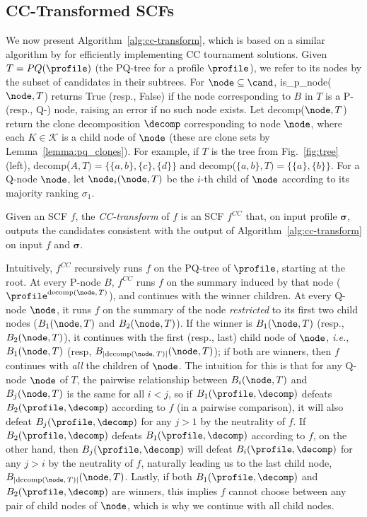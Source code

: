 \subsection{CC-Transformed SCFs}\label{subsec:transform}
We now present Algorithm~\ref{alg:cc-transform}, which is based on a similar algorithm by \citet{Brandt11:Fixed} for efficiently implementing CC tournament solutions. Given $T=PQ(\profile)$ (the PQ-tree for a profile $\profile$), we refer to its nodes by the subset of candidates in their subtrees. For $\node \subseteq \cand$, is\_p\_node($\node,T$) returns True (resp., False) if the node corresponding to $B$ in $T$ is a P- (resp., Q-) node, raising an error if no such node exists. Let decomp($\node,T$) return the clone decomposition $\decomp$ corresponding to node $\node$, where each $K\in \mathcal{K}$ is a child node of $\node$ (these are clone sets by Lemma~\ref{lemma:pq_clones}).
For example, if $T$ is the tree from Fig.~\ref{fig:tree}(left),
decomp($A,T)=\{\{a,b\}, \{c\}, \{d\}\}$ and  decomp($\{a,b\},T)=\{\{a\}, \{b\}\}$.  For a Q-node $\node$, let $\node_i(\node,T)$ be the $i$-th child of $\node$ according to its majority ranking $\sigma_1$. 

\begin{definition}\label{def:cc-transform}
    Given an SCF $f$, the \emph{CC-transform} of $f$ is an SCF $f^{CC}$ that, on input profile $\boldsymbol{\sigma}$, outputs the candidates consistent with the output of Algorithm~\ref{alg:cc-transform} on input $f$ and $\boldsymbol{\sigma}$. 
\end{definition}

Intuitively, $f^{CC}$ recursively runs $f$ on the PQ-tree of $\profile$, starting at the root. At every P-node $B$, $f^{CC}$ runs $f$ on the summary induced by that node ($\profile^{\text{decomp($\node,T$)}}$), and continues with the winner children. At every Q-node $\node$, it runs $f$ on the summary of the node \emph{restricted} to its first two child nodes ($B_1(\node,T)$ and $B_2(\node,T)$). If the winner is $B_1(\node,T)$ (resp., $B_2(\node,T)$), it continues with the first (resp., last) child node of $\node$, \emph{i.e.}, $B_1(\node, T)$ (resp, $B_{|\text{decomp($\node,T$)}|}(\node, T)$); if both are winners, then $f$ continues with \emph{all} the children of $\node$. The intuition for this is that for any Q-node $\node$ of $T$, the pairwise relationship between $B_i(\node,T)$ and $B_j(\node,T)$ is the same for all $i<j$, so if $B_1(\profile, \decomp)$ defeats $B_2(\profile, \decomp)$ according to $f$ (in a pairwise comparison), it will also defeat $B_j(\profile, \decomp)$ for any $j>1$ by the neutrality of $f$. If $B_2(\profile, \decomp)$ defeats $B_1(\profile, \decomp)$ according to $f$, on the other hand, then $B_j(\profile, \decomp)$ will defeat $B_i(\profile, \decomp)$ for any $j>i$ by the neutrality of $f$, naturally leading us to the last child node, $B_{|\text{decomp($\node,T$)}|}(\node, T)$. Lastly, if both $B_1(\profile, \decomp)$ and $B_2(\profile, \decomp)$ are winners, this implies $f$ cannot choose between any pair of child nodes of $\node$, which is why we continue with all child nodes.


